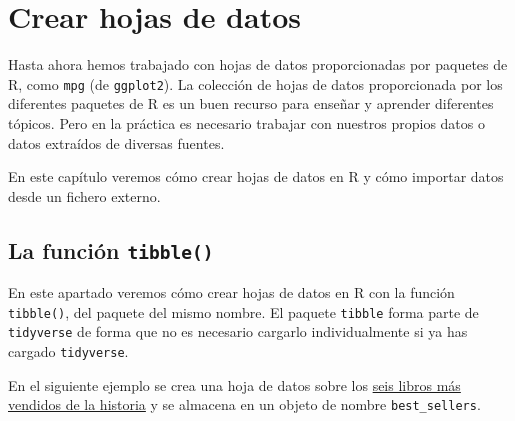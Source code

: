 \documentclass[
  title=normal,
  notoc,
  bib=normal]{mnye}
\begin{document}
\hypertarget{tibbles}{%
\section{Crear hojas de datos}\label{tibbles}}

Hasta ahora hemos trabajado con hojas de datos proporcionadas por paquetes de \textsf{R}, como \texttt{mpg} (de \texttt{ggplot2}). La colección de hojas de datos proporcionada por los diferentes paquetes de \textsf{R} es un buen recurso para enseñar y aprender diferentes tópicos. Pero en la práctica es necesario trabajar con nuestros propios datos o datos extraídos de diversas fuentes.

En este capítulo veremos cómo crear hojas de datos en \textsf{R} y cómo importar datos desde un fichero externo.

\hypertarget{la-funciuxf3n-tibble}{%
\subsection{\texorpdfstring{La función \texttt{tibble()}}{La función tibble()}}\label{la-funciuxf3n-tibble}}

En este apartado veremos cómo crear hojas de datos en \textsf{R} con la función \texttt{tibble()}, del paquete del mismo nombre. El paquete \texttt{tibble} forma parte de \texttt{tidyverse} de forma que no es necesario cargarlo individualmente si ya has cargado \texttt{tidyverse}.

En el siguiente ejemplo se crea una hoja de datos sobre los \href{https://en.wikipedia.org/wiki/List_of_best-selling_books}{seis libros más vendidos de la historia} y se almacena en un objeto de nombre \texttt{best\_sellers}.
\end{document}
